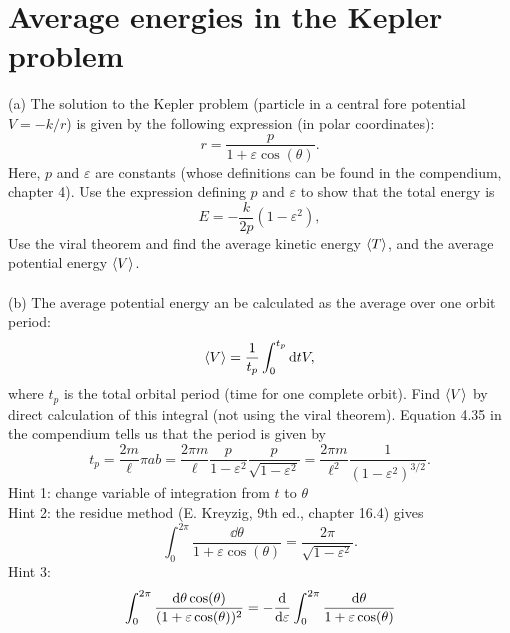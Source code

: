 \documentclass{article}
\begin{document}
    \section{Average energies in the Kepler problem}
        (a) The solution to the Kepler problem (particle in a central fore potential $V = -k/r$) is given by the following expression (in polar coordinates):
        \begin{equation*}
            r = \frac{p}{1 + \varepsilon \cos(\theta)}.
        \end{equation*}
        Here, $p$ and $\varepsilon$ are constants (whose definitions can be found in the compendium, chapter 4). Use the expression defining $p$ and $\varepsilon$ to show that the total energy is 
        \begin{equation*}
            E = - \frac{k}{2p}(1 - \varepsilon^2),
        \end{equation*}
        Use the viral theorem and find the average kinetic energy $\expectationvalue{T}$, and the average potential energy $\expectationvalue{V}$. \\ \\
        (b) The average potential energy an be calculated as the average over one orbit period:
        \begin{equation*}
            \expval{V} = \frac{1}{t_p} \int_0^{t_p} \dd t V,
        \end{equation*}
        where $t_p$ is the total orbital period (time for one complete orbit). Find $\expval{V}$ by direct calculation of this integral (not using the viral theorem). Equation 4.35 in the compendium tells us that the period is given by
        \begin{equation*}
            t_p = \frac{2m}{\ell} \pi a b = \frac{2 \pi m}{\ell } \frac{p}{1 - \varepsilon^2} \frac{p}{\sqrt{1 - \varepsilon^2}} = \frac{2 \pi m}{\ell^2} \frac{1}{(1 - \varepsilon^2)^{3/2}}.
        \end{equation*}
        Hint 1: change variable of integration from $t$ to $\theta$\\
        Hint 2: the residue method (E. Kreyzig, 9th ed., chapter 16.4) gives
        \begin{equation*}
            \int_0^{2\pi} \frac{\dd \theta}{1 + \varepsilon \cos(\theta)} = \frac{2 \pi}{\sqrt{1 - \varepsilon^2}}.
        \end{equation*}
        Hint 3: 
        \begin{equation*}
            \int_0^{2\pi} \frac{\dd \theta \cos(\theta)}{(1 + \varepsilon \cos(\theta))^2} = - \dv{\varepsilon} \int_0^{2\pi} \frac{\dd \theta}{1 + \varepsilon \cos(\theta)}  
        \end{equation*}
\end{document}
